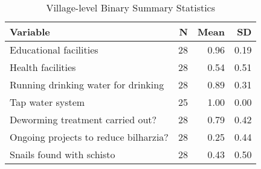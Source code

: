 \begin{table}[!t]
\caption*{
{\large Village-level Binary Summary Statistics}
} 
\fontsize{12.0pt}{14.4pt}\selectfont
\begin{tabular*}{\linewidth}{@{\extracolsep{\fill}}lrrr}
\toprule
Variable & N & Mean & SD \\ 
\midrule\addlinespace[2.5pt]
Educational facilities & 28 & 0.96 & 0.19 \\ 
Health facilities & 28 & 0.54 & 0.51 \\ 
Running drinking water for drinking & 28 & 0.89 & 0.31 \\ 
Tap water system & 25 & 1.00 & 0.00 \\ 
Deworming treatment carried out? & 28 & 0.79 & 0.42 \\ 
Ongoing projects to reduce bilharzia? & 28 & 0.25 & 0.44 \\ 
Snails found with schisto & 28 & 0.43 & 0.50 \\ 
\bottomrule
\end{tabular*}
\end{table}

